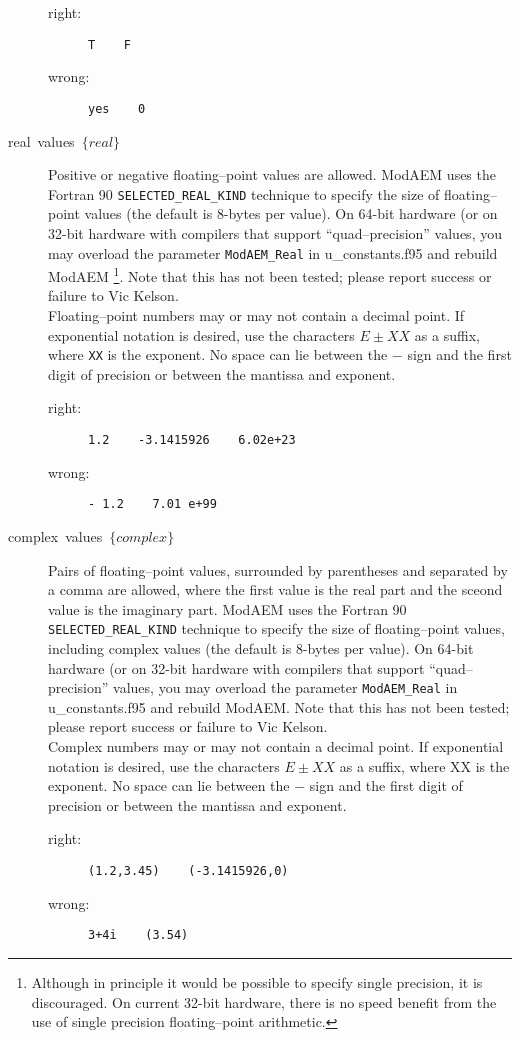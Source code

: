 \begin{description}
\begin{description}
\item [{right:}] \texttt{T~~~~F}
\item [{wrong:}] \texttt{yes~~~~0}
\end{description}
\item [{real~values~$\{real\}$}] Positive or negative floating--point
values are allowed. ModAEM uses the Fortran 90 \texttt{SELECTED\_REAL\_KIND}
technique to specify the size of floating--point values (the default
is 8-bytes per value). On 64-bit hardware (or on 32-bit hardware with
compilers that support ``quad--precision'' values, you may overload
the parameter \texttt{ModAEM\_Real} in \textsf{u\_constants.f95} and
rebuild ModAEM%
\footnote{Although in principle it would be possible to specify single precision,
it is discouraged. On current 32-bit hardware, there is no speed benefit
from the use of single precision floating--point arithmetic.%
}. Note that this has not been tested; please report success or failure
to Vic Kelson.\\
Floating--point numbers may or may not contain a decimal point. If
exponential notation is desired, use the characters \texttt{$E\pm XX$}
as a suffix, where \texttt{XX} is the exponent. No space can lie between
the $-$ sign and the first digit of precision or between the mantissa
and exponent.

\begin{description}
\item [{right:}] \texttt{1.2~~~~-3.1415926~~~~6.02e+23}
\item [{wrong:}] \texttt{-~1.2~~~~7.01~e+99}
\end{description}
\item [{complex~values~$\{complex\}$}] Pairs of  floating--point values,
surrounded by parentheses and separated by a comma are allowed, where
the first value is the real part and the sceond value is the imaginary
part. ModAEM uses the Fortran 90 \texttt{SELECTED\_REAL\_KIND} technique
to specify the size of floating--point values, including complex values
(the default is 8-bytes per value). On 64-bit hardware (or on 32-bit
hardware with compilers that support ``quad--precision'' values,
you may overload the parameter \texttt{ModAEM\_Real} in \textsf{u\_constants.f95}
and rebuild ModAEM. Note that this has not been tested; please report
success or failure to Vic Kelson.\\
Complex numbers may or may not contain a decimal point. If exponential
notation is desired, use the characters \texttt{$E\pm XX$} as a suffix,
where XX
 is the exponent. No space can lie between the $-$ sign and the first
digit of precision or between the mantissa and exponent.

\begin{description}
\item [{right:}] \texttt{(1.2,3.45)~~~~(-3.1415926,0)}
\item [{wrong:}] \texttt{3+4i~~~~(3.54)}
\end{description}
\end{description}


